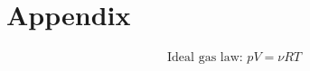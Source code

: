 \section{Appendix}
    
    \begin{align}
        \text{Ideal gas law: } pV = \nu RT \label{eq_igl}
    \end{align}